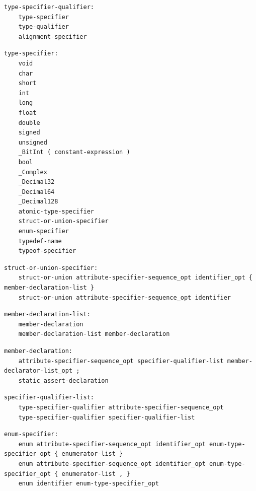 \noindent\textbf{\texttt{}}\par
\begin{lstlisting}
type-specifier-qualifier:
    type-specifier
    type-qualifier
    alignment-specifier
\end{lstlisting}

\noindent\textbf{\texttt{}}\par
\begin{lstlisting}
type-specifier:
    void
    char
    short
    int
    long
    float
    double
    signed
    unsigned
    _BitInt ( constant-expression )
    bool
    _Complex
    _Decimal32
    _Decimal64
    _Decimal128
    atomic-type-specifier
    struct-or-union-specifier
    enum-specifier
    typedef-name
    typeof-specifier
\end{lstlisting}

\noindent\textbf{\texttt{}}\par
\begin{lstlisting}
struct-or-union-specifier:
    struct-or-union attribute-specifier-sequence_opt identifier_opt { member-declaration-list }
    struct-or-union attribute-specifier-sequence_opt identifier
\end{lstlisting}

\noindent\textbf{\texttt{}}\par
\begin{lstlisting}
member-declaration-list:
    member-declaration
    member-declaration-list member-declaration
\end{lstlisting}

\noindent\textbf{\texttt{}}\par
\begin{lstlisting}
member-declaration:
    attribute-specifier-sequence_opt specifier-qualifier-list member-declarator-list_opt ;
    static_assert-declaration
\end{lstlisting}

\noindent\textbf{\texttt{}}\par
\begin{lstlisting}
specifier-qualifier-list:
    type-specifier-qualifier attribute-specifier-sequence_opt
    type-specifier-qualifier specifier-qualifier-list
\end{lstlisting}

\noindent\textbf{\texttt{}}\par
\begin{lstlisting}
enum-specifier:
    enum attribute-specifier-sequence_opt identifier_opt enum-type-specifier_opt { enumerator-list }
    enum attribute-specifier-sequence_opt identifier_opt enum-type-specifier_opt { enumerator-list , }
    enum identifier enum-type-specifier_opt
\end{lstlisting}

